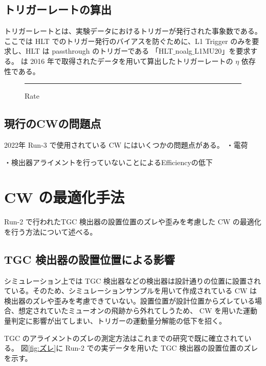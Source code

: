 \subsection{トリガーレートの算出}
トリガーレートとは、実験データにおけるトリガーが発行された事象数である。ここでは HLT でのトリガー発行のバイアスを防ぐために、L1 Trigger のみを要求し、HLT は passthrough のトリガーである 「HLT$\_$noalg$\_$L1MU20」を要求する。 は 2016 年で取得されたデータを用いて算出したトリガーレートの $\eta$ 依存性である。

\begin{figure}[tb]
  \centering
  \rule{8cm}{6cm}
  \caption{Rate}
  \label{fig:Run3_rate}
\end{figure}

\subsection{現行のCWの問題点}
2022年 Run-3 で使用されている CW にはいくつかの問題点がある。
・電荷


・検出器アライメントを行っていないことによるEfficiencyの低下



\section{CW の最適化手法}\label{section:最適化}
Run-2 で行われたTGC 検出器の設置位置のズレや歪みを考慮した CW の最適化を行う方法について述べる。

\subsection{TGC 検出器の設置位置による影響}
シミュレーション上では TGC 検出器などの検出器は設計通りの位置に設置されている。そのため、シミュレーションサンプルを用いて作成されている CW は検出器のズレや歪みを考慮できていない。設置位置が設計位置からズレている場合、想定されていたミューオンの飛跡から外れてしうため、 CW を用いた運動量判定に影響が出てしまい、トリガーの運動量分解能の低下を招く。

TGC のアライメントのズレの測定方法はこれまでの研究で既に確立されている。
図\ref{fig:ズレ}に Run-2 での実データを用いた TGC 検出器の設置位置のズレを示す。

